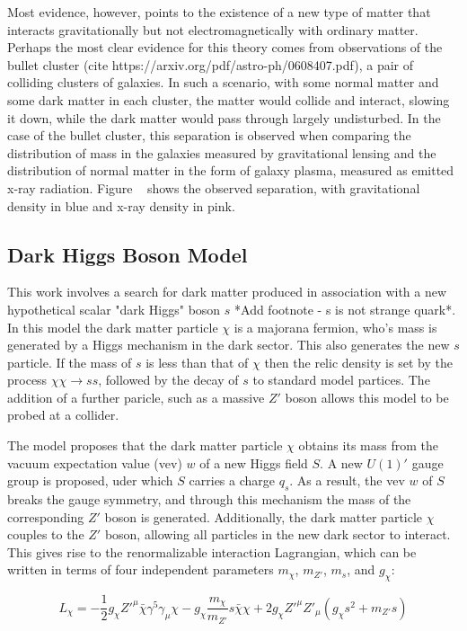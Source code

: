 Most evidence, however, points to the existence of a new type of matter that interacts gravitationally but not electromagnetically with ordinary matter. Perhaps the most clear evidence for this theory comes from observations of the bullet cluster (cite https://arxiv.org/pdf/astro-ph/0608407.pdf), a pair of colliding clusters of galaxies. In such a scenario, with some normal matter and some dark matter in each cluster, the matter would collide and interact, slowing it down, while the dark matter would pass through largely undisturbed. In the case of the bullet cluster, this separation is observed when comparing the distribution of mass in the galaxies measured by gravitational lensing and the distribution of normal matter in the form of galaxy plasma, measured as emitted x-ray radiation. Figure ~ shows the observed separation, with gravitational density in blue and x-ray density in pink.

\subsection{Dark Higgs Boson Model}
This work involves a search for dark matter produced in association with a new hypothetical scalar "dark Higgs" boson $s$ *Add footnote - s is not strange quark*. In this model the dark matter particle $\chi$ is a majorana fermion, who's mass is generated by a Higgs mechanism in the dark sector. This also generates the new $s$ particle. If the mass of $s$ is less than that of $\chi$ then the relic density is set by the process $\chi\chi \rightarrow ss$, followed by the decay of $s$ to standard model partices. The addition of a further paricle, such as a massive $Z'$ boson allows this model to be probed at a collider.

The model proposes that the dark matter particle $\chi$ obtains its mass from the vacuum expectation value (vev) $w$ of a new Higgs field $S$. A new $U(1)'$ gauge group is proposed, uder which $S$ carries a charge $q_s$. As a result, the vev $w$ of $S$ breaks the gauge symmetry, and through this mechanism the mass of the corresponding $Z'$ boson is generated. Additionally, the dark matter particle $\chi$ couples to the $Z'$ boson, allowing all particles in the new dark sector to interact. This gives rise to the renormalizable interaction Lagrangian, which can be written in terms of four independent parameters $m_{\chi}$, $m_{Z'}$, $m_{s}$, and $g_{\chi}$:

$$ L_{\chi} = -\frac{1}{2}g_{\chi}Z'^{\mu}\bar{\chi}\gamma^5\gamma_{\mu}\chi - g_{\chi}\frac{m_{\chi}}{m_{Z'}}s\bar{\chi}\chi + 2g_{\chi}Z'^{\mu}Z'_{\mu}(g_{\chi}s^2 + m_{Z'}s) $$

